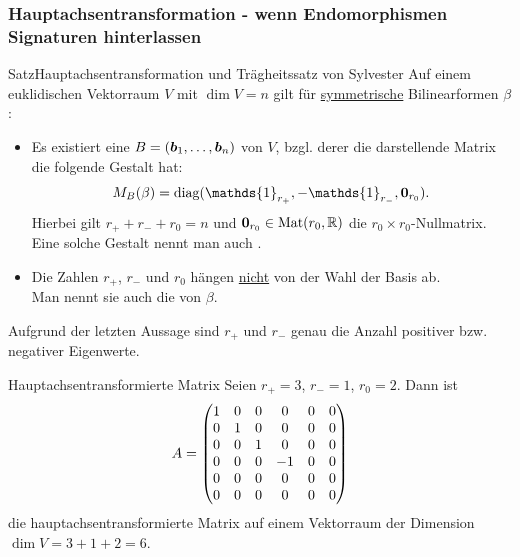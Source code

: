 \subsubsection{Hauptachsentransformation - wenn Endomorphismen Signaturen hinterlassen}
\begin{Satz}
{Satz}{Hauptachsentransformation und Trägheitssatz von Sylvester}
Auf einem euklidischen Vektorraum $V$ mit $\dim V=n$ gilt für \underline{symmetrische} Bilinearformen $\beta$:
\begin{itemize}
    \item Es existiert eine  $B=({{\text{\boldmath${b}$}}}_1,\ldots,{{\text{\boldmath${b}$}}}_n)$ von $V$, bzgl. derer die darstellende Matrix die folgende Gestalt hat:
    \begin{equation}
        M_B(\beta)=\diag(\mathds{1}_{r_+},-\mathds{1}_{r_-},\Vec{0}_{r_0}).
    \end{equation}
    Hierbei gilt $\boxed{r_++r_-+r_0=n}$ und ${\text{\boldmath${0}$}}_{r_0}\in\text{Mat}(r_0,\mathbb{R})$ die $r_0\times r_0$-Nullmatrix.\\
    Eine solche Gestalt nennt man auch .
    \item Die Zahlen $r_+$, $r_-$ und $r_0$ hängen \underline{nicht} von der Wahl der Basis ab.\\
    Man nennt sie auch die  von $\beta$.
\end{itemize}
Aufgrund der letzten Aussage sind $r_+$ und $r_-$ genau die Anzahl positiver bzw. negativer Eigenwerte.
\end{Satz}
\begin{Beispiel}
{Hauptachsentransformierte Matrix}
Seien $r_+=3$, $r_-=1$, $r_0=2$. Dann ist
\begin{equation*}
    A=\begin{pmatrix}1&0&0&0&0&0\\0&1&0&0&0&0\\0&0&1&0&0&0\\0&0&0&-1&0&0\\0&0&0&0&0&0\\0&0&0&0&0&0\end{pmatrix}
\end{equation*}
die hauptachsentransformierte Matrix auf einem Vektorraum der Dimension\\
$\dim V=3+1+2=6$.
\end{Beispiel}
